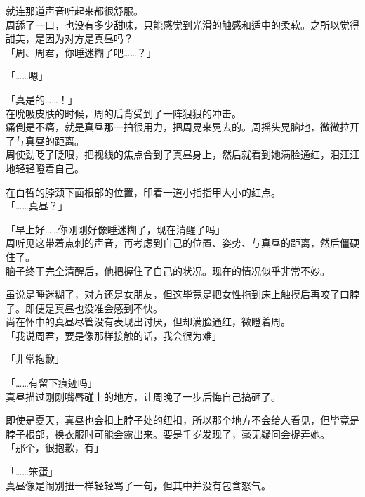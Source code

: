 就连那道声音听起来都很舒服。\\

周舔了一口，也没有多少甜味，只能感觉到光滑的触感和适中的柔软。之所以觉得甜美，是因为对方是真昼吗？\\

「周、周君，你睡迷糊了吧……？」

「……嗯」

「真是的……！」\\

在吮吸皮肤的时候，周的后背受到了一阵狠狠的冲击。\\

痛倒是不痛，就是真昼那一拍很用力，把周晃来晃去的。周摇头晃脑地，微微拉开了与真昼的距离。\\

周使劲眨了眨眼，把视线的焦点合到了真昼身上，然后就看到她满脸通红，泪汪汪地轻轻瞪着自己。

在白皙的脖颈下面根部的位置，印着一道小指指甲大小的红点。\\

「……真昼？」

「早上好……你刚刚好像睡迷糊了，现在清醒了吗」\\

周听见这带着点刺的声音，再考虑到自己的位置、姿势、与真昼的距离，然后僵硬住了。\\

脑子终于完全清醒后，他把握住了自己的状况。现在的情况似乎非常不妙。

虽说是睡迷糊了，对方还是女朋友，但这毕竟是把女性拖到床上触摸后再咬了口脖子。即便是真昼也没准会感到不快。\\

尚在怀中的真昼尽管没有表现出讨厌，但却满脸通红，微瞪着周。\\

「我说周君，要是像那样接触的话，我会很为难」

「非常抱歉」

「……有留下痕迹吗」\\

真昼描过刚刚嘴唇碰上的地方，让周晚了一步后悔自己搞砸了。

即使是夏天，真昼也会扣上脖子处的纽扣，所以那个地方不会给人看见，但毕竟是脖子根部，换衣服时可能会露出来。要是千岁发现了，毫无疑问会捉弄她。\\

「那个，很抱歉，有」

「……笨蛋」\\

真昼像是闹别扭一样轻轻骂了一句，但其中并没有包含怒气。\\

